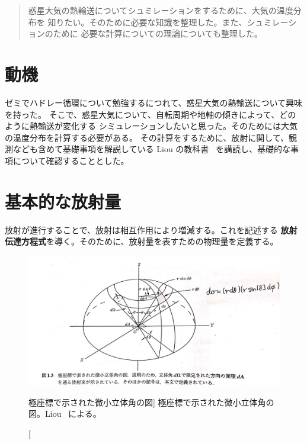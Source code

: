 \documentclass[article]{dennou777}
\renewcommand{\maketitle}{\epmaketitle}
\newcommand{\hmemph}[1]{\textbf{#1}}
\begin{document}
\begin{titlepage}
	\maketitle
\end{titlepage}

\begin{abstract}
	惑星大気の熱輸送についてシュミレーションをするために、大気の温度分布を
	知りたい。そのために必要な知識を整理した。また、シュミレーションのために
	必要な計算についての理論についても整理した。
\end{abstract}

\tableofcontents
\pagebreak

\listoffigures
\pagebreak

\section{動機}

ゼミでハドレー循環について勉強するにつれて、惑星大気の熱輸送について興味を持った。
そこで、惑星大気について、自転周期や地軸の傾きによって、どのように熱輸送が変化する
シミュレーションしたいと思った。そのためには大気の温度分布を計算する必要がある。
その計算をするために、放射に関して、観測なども含めて基礎事項を解説している Liou
の教科書~\cite{liou} を講読し、基礎的な事項について確認することとした。

\section{基本的な放射量}

放射が進行することで、放射は相互作用により増減する。これを記述する
\hmemph{放射伝達方程式}を導く。そのために、放射量を表すための物理量を定義する。

\begin{figure}[t]
	\includegraphics[width=\linewidth]{eq.jpg}
	\caption
		[極座標で示された微小立体角の図]
		{極座標で示された微小立体角の図。Liou~\cite{liou} による。}
\end{figure}
\end{document}
